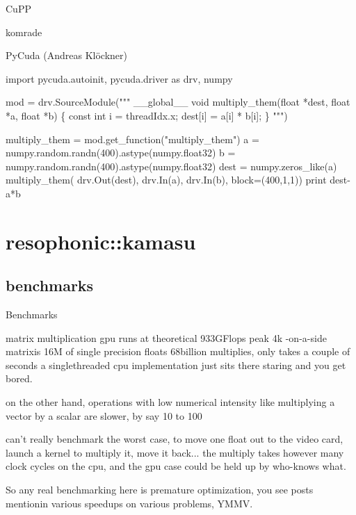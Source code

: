 \documentclass[9pt]{beamer}
\begin{document}
\begin{frame}{CuPP}
  
\end{frame}

\begin{frame}{komrade}
  
\end{frame}


\begin{frame}[fragile]{PyCuda (Andreas Kl\"ockner)}
  \begin{semiverbatim}import pycuda.autoinit, pycuda.driver as drv, numpy

mod = drv.SourceModule("""
__global__ void multiply_them(float *dest, float *a, float *b)
\{
  const int i = threadIdx.x;
  dest[i] = a[i] * b[i];
\}
""")

multiply_them = mod.get_function("multiply_them")
a = numpy.random.randn(400).astype(numpy.float32)
b = numpy.random.randn(400).astype(numpy.float32)
dest = numpy.zeros_like(a)
multiply_them(
    drv.Out(dest), drv.In(a), drv.In(b),
    block=(400,1,1))
print dest-a*b
  \end{semiverbatim}



\end{frame}

\section{resophonic::kamasu}
\subsection{benchmarks}

\begin{frame}{Benchmarks}
\end{frame}


\begin{frame}{matrix multiplication}
gpu runs at theoretical 933GFlops peak 4k -on-a-side matrixis 16M of
single precision floats 68billion multiplies, only takes a couple of
seconds a singlethreaded cpu implementation just sits there staring
and you get bored.

on the other hand, operations with low numerical intensity like
multiplying a vector by a scalar are slower, by say 10 to 100

can't really benchmark the worst case, to move one float out to the
video card, launch a kernel to multiply it, move it back... the
multiply takes however many clock cycles on the cpu, and the gpu case
could be held up by who-knows what.   

So any real benchmarking here is premature optimization, you see posts
mentionin various speedups on various problems, YMMV.  
\end{frame}
\end{document}
